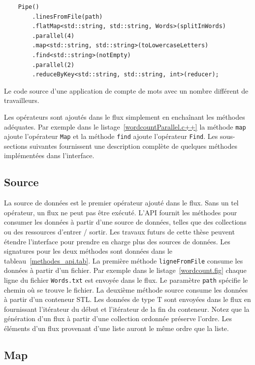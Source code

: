 \begin{Listing}[tbp]
\begin{lstlisting}
	Pipe()
		.linesFromFile(path) 
		.flatMap<std::string, std::string, Words>(splitInWords)
		.parallel(4)
		.map<std::string, std::string>(toLowercaseLetters)
		.find<std::string>(notEmpty)
		.parallel(2)
		.reduceByKey<std::string, std::string, int>(reducer);
\end{lstlisting}
\caption{Le code source d'une application de compte de mots avec un nombre diff\'erent de travailleurs.}
\label{wordcountParallel.c++}
\end{Listing}

Les op\'erateurs sont ajout\'es dans le flux simplement en encha\^inant les m\'ethodes ad\'equates. Par exemple dans le listage~\ref{wordcountParallel.c++} la m\'ethode \texttt{map} ajoute l'opérateur \texttt{Map} et la m\'ethode \texttt{find} ajoute l'op\'erateur \texttt{Find}. Les sous-sections suivantes fournissent une description compl\`ete de quelques m\'ethodes impl\'ement\'ees dans l'interface.


\subsection{Source}

La source de donn\'ees est le premier op\'erateur ajout\'e dans le flux. Sans un tel op\'erateur, un flux ne peut pas \^etre ex\'ecut\'e. L'API fournit les m\'ethodes pour consumer les donn\'ees \`a partir d'une source de donn\'ees, telles que des collections ou des ressources d'entrer / sortir. Les travaux futurs de cette th\`ese peuvent \'etendre l'interface pour prendre en charge plus des sources de donn\'ees. Les signatures pour les deux m\'ethodes sont donn\'ees dans le tableau~\ref{methodes_api.tab}. La premi\`ere m\'ethode \texttt{ligneFromFile} consume les donn\'ees \`a partir d'un fichier.  Par exemple dans le listage~\ref{wordcount.fig} chaque ligne du fichier \texttt{Words.txt} est envoy\'ee dans le flux. Le param\`etre \texttt{path} sp\'ecifie le chemin o\`u se trouve le fichier. La deuxi\`eme m\'ethode source consume les donn\'ees \`a partir d'un conteneur STL. Les donn\'ees de type T sont envoy\'ees dans le flux en fournissant l'it\'erateur du d\'ebut et l'it\'erateur de la fin du conteneur. Notez que la g\'en\'eration d'un flux \`a partir d'une collection ordonn\'ee pr\'eserve l'ordre. Les \'el\'ements d'un flux provenant d'une liste auront le m\^eme ordre que la liste.


\subsection{Map}


